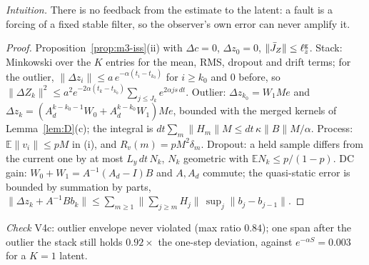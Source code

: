 \emph{Intuition.} There is no feedback from the estimate to the latent: a fault is a forcing of a
fixed stable filter, so the observer's own error can never amplify it.

\begin{proof}
Proposition~\ref{prop:m3-iss}(ii) with $\Delta c=0$, $\Delta z_0=0$, $\|\bar J_Z\|\le\ell^{\rm g}_z$. Stack: Minkowski over the
$K$ entries for the mean, RMS, dropout and drift terms; for the outlier, $\|\Delta z_i\|\le a\,e^{-\alpha(t_i-t_{k_0})}$ for
$i\ge k_0$ and $0$ before, so $\|\Delta Z_k\|^2\le a^2e^{-2\alpha(t_k-t_{k_0})}\sum_{j\le J_k}e^{2\alpha js\,dt}$. Outlier:
$\Delta z_{k_0}=W_1Me$ and $\Delta z_k=(A_d^{k-k_0-1}W_0+A_d^{k-k_0}W_1)Me$, bounded with the merged kernels of
Lemma~\ref{lem:D}(c); the integral is $dt\sum_m\|H_m\|M\le dt\,\kappa\|B\|M/\alpha$. Process:
$\mathbb E\|v_i\|\le pM$ in (i), and $R_v(m)=pM^2\delta_m$. Dropout: a held sample differs from the
current one by at most $L_y\,dt\,N_k$, $N_k$ geometric with $\mathbb EN_k\le p/(1-p)$. DC gain:
$W_0+W_1=A^{-1}(A_d-I)B$ and $A,A_d$ commute; the quasi-static error is bounded by summation by parts,
$\|\Delta z_k+A^{-1}Bb_k\|\le\sum_{m\ge1}\|\sum_{j\ge m}H_j\|\,\sup_j\|b_j-b_{j-1}\|$.
\end{proof}

\noindent\emph{Check} V4c: outlier envelope never violated (max ratio $0.84$); one span after the outlier the stack still holds
$0.92\times$ the one-step deviation, against $e^{-\alpha S}=0.003$ for a $K=1$ latent.

